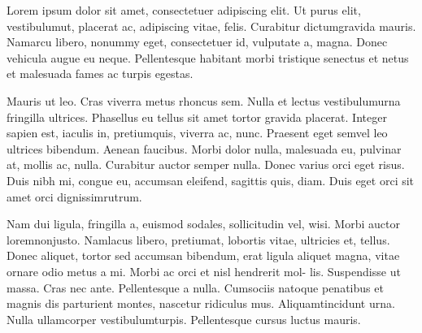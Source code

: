 \documentclass[12pt]{article}
\begin{document}
	



Lorem ipsum dolor sit amet, consectetuer adipiscing elit. Ut purus elit,
vestibulumut, placerat ac, adipiscing vitae, felis. Curabitur dictumgravida
mauris. Namarcu libero, nonummy eget, consectetuer id, vulputate a, magna.
 Donec vehicula augue eu neque. Pellentesque habitant morbi tristique
senectus et netus et malesuada fames ac turpis egestas. 


Mauris ut leo. Cras viverra metus rhoncus sem. Nulla et lectus vestibulumurna fringilla ultrices.
Phasellus eu tellus sit amet tortor gravida placerat.
 Integer sapien est, iaculis in, pretiumquis, viverra ac, nunc. Praesent eget semvel leo ultrices
bibendum. Aenean faucibus. Morbi dolor nulla, malesuada eu, pulvinar at,
mollis ac, nulla. Curabitur auctor semper nulla. Donec varius orci eget risus.
Duis nibh mi, congue eu, accumsan eleifend, sagittis quis, diam. Duis eget
orci sit amet orci dignissimrutrum.

Nam dui ligula, fringilla a, euismod sodales, sollicitudin vel, wisi. Morbi
auctor loremnonjusto. Namlacus libero, pretiumat, lobortis vitae, ultricies
et, tellus. Donec aliquet, tortor sed accumsan bibendum, erat ligula aliquet
magna, vitae ornare odio metus a mi. Morbi ac orci et nisl hendrerit mol-
lis. Suspendisse ut massa. Cras nec ante. Pellentesque a nulla. Cumsociis
natoque penatibus et magnis dis parturient montes, nascetur ridiculus mus.
Aliquamtincidunt urna. Nulla ullamcorper vestibulumturpis. Pellentesque
cursus luctus mauris.
\end{document}
